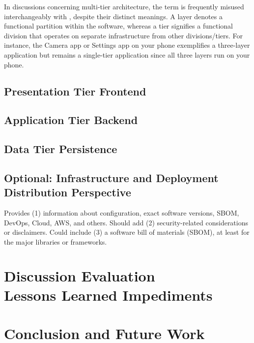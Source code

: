 \documentclass[conference,a4paper]{cs-techrep}
\begin{document}
In discussions concerning multi-tier architecture, the term  is frequently misused interchangeably with , despite their distinct meanings. A layer denotes a functional partition within the software, whereas a tier signifies a functional division that operates on separate infrastructure from other divisions/tiers. For instance, the Camera app or Settings app on your phone exemplifies a three-layer application but remains a single-tier application since all three layers run on your phone.


\subsection{Presentation Tier \textbar{} Frontend}
\lipsum[3]

\subsection{Application Tier \textbar{} Backend \textbar{} }
\lipsum[4]

\subsection{Data Tier \textbar{} Persistence}
\lipsum[5]

\subsection{Optional: Infrastructure and Deployment \textbar{} Distribution Perspective \textbar{} }
Provides (1) information about configuration, exact software versions, SBOM, DevOps, Cloud, AWS, and others.
Should add (2) security-related considerations or disclaimers.
Could include (3) a software bill of materials (SBOM), at least for the major libraries or frameworks.


\section{Discussion \textbar{} Evaluation \textbar{} \\ Lessons Learned \textbar{} Impediments}
\lipsum[6]

\section{Conclusion and Future Work \textbar{} \\ }
\lipsum[7]
\end{document}
